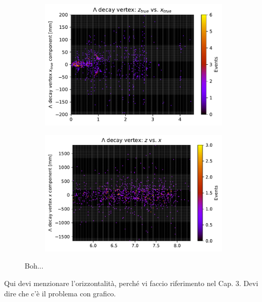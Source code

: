 \begin{figure}[t]
	\centering
	\begin{subfigure}{.45\textwidth}
		\includegraphics[width=\textwidth]{graphics/04-event_selection/LEVz_MC_ztrue-vs-xtrue.pdf}
		\caption{}
	\end{subfigure}
	\begin{subfigure}{.45\textwidth}
		\includegraphics[width=\textwidth]{graphics/04-event_selection/LEVz_MC_z-vs-x.pdf}
		\caption{}
	\end{subfigure}
	\caption[A and b.]{Boh...}
\end{figure}


Qui devi menzionare l'orizzontalità, perché vi faccio riferimento nel Cap. 3. Devi dire che c'è il problema con grafico.

